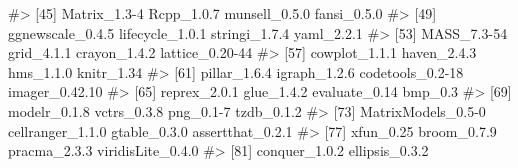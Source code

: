 \begin{Schunk}
\begin{Soutput}
#> [45] Matrix_1.3-4       Rcpp_1.0.7         munsell_0.5.0      fansi_0.5.0       
#> [49] ggnewscale_0.4.5   lifecycle_1.0.1    stringi_1.7.4      yaml_2.2.1        
#> [53] MASS_7.3-54        grid_4.1.1         crayon_1.4.2       lattice_0.20-44   
#> [57] cowplot_1.1.1      haven_2.4.3        hms_1.1.0          knitr_1.34        
#> [61] pillar_1.6.4       igraph_1.2.6       codetools_0.2-18   imager_0.42.10    
#> [65] reprex_2.0.1       glue_1.4.2         evaluate_0.14      bmp_0.3           
#> [69] modelr_0.1.8       vctrs_0.3.8        png_0.1-7          tzdb_0.1.2        
#> [73] MatrixModels_0.5-0 cellranger_1.1.0   gtable_0.3.0       assertthat_0.2.1  
#> [77] xfun_0.25          broom_0.7.9        pracma_2.3.3       viridisLite_0.4.0 
#> [81] conquer_1.0.2      ellipsis_0.3.2
\end{Soutput}
\end{Schunk}




\address{%
Joseph Zemmels\\
Center for Statistics and Applications in Forensic Evidence\\%
Department of Statistics\\ Iowa State University\\ 2438 Osborn
Drive\\ Ames, IA 50011\\
%
%
%
\href{mailto:jzemmels@iastate.edu}{\nolinkurl{jzemmels@iastate.edu}}%
}

\address{%
Susan VanderPlas\\
University of Nebraska - Lincoln\\%
Department of Statistics\\ 340 Hardin Hall North Wing\\ Lincoln, NE
68583\\
%
%
%
\href{mailto:susan.vanderplas@unl.edu}{\nolinkurl{susan.vanderplas@unl.edu}}%
}

\address{%
Heike Hofmann\\
Center for Statistics and Applications in Forensic Evidence\\%
Department of Statistics\\ Iowa State University\\ 2438 Osborn
Drive\\ Ames, IA 50011\\
%
%
%
\href{mailto:hofmann@iastate.edu}{\nolinkurl{hofmann@iastate.edu}}%
}
